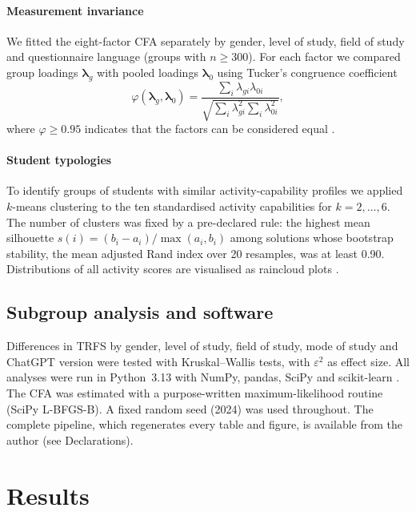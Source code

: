 \documentclass[pdflatex,sn-basic]{sn-jnl}%
\theoremstyle{plain}
\theoremstyle{remark}
\begin{document}
\paragraph{Measurement invariance} We fitted the eight-factor CFA separately by gender, level of study, field of study and questionnaire language (groups with $n\ge300$). For each factor we compared group loadings $\boldsymbol\lambda_g$ with pooled loadings $\boldsymbol\lambda_0$ using Tucker's congruence coefficient
\begin{equation}
\varphi(\boldsymbol\lambda_g,\boldsymbol\lambda_0)=\frac{\sum_i\lambda_{gi}\lambda_{0i}}{\sqrt{\sum_i\lambda_{gi}^2\sum_i\lambda_{0i}^2}},
\label{eq:tucker}
\end{equation}
where $\varphi\ge0.95$ indicates that the factors can be considered equal \citep{lorenzo2006}.

\paragraph{Student typologies} To identify groups of students with similar activity-capability profiles we applied $k$-means clustering \citep{lloyd1982} to the ten standardised activity capabilities for $k=2,\dots,6$. The number of clusters was fixed by a pre-declared rule: the highest mean silhouette $s(i)=(b_i-a_i)/\max(a_i,b_i)$ \citep{rousseeuw1987} among solutions whose bootstrap stability, the mean adjusted Rand index \citep{hubert1985} over 20 resamples, was at least 0.90. Distributions of all activity scores are visualised as raincloud plots \citep{allen2019}.

\subsection{Subgroup analysis and software}
Differences in TRFS by gender, level of study, field of study, mode of study and ChatGPT version were tested with Kruskal--Wallis tests, with $\varepsilon^2$ as effect size. All analyses were run in Python~3.13 with NumPy, pandas, SciPy and scikit-learn \citep{pedregosa2011}. The CFA was estimated with a purpose-written maximum-likelihood routine (SciPy L-BFGS-B). A fixed random seed (2024) was used throughout. The complete pipeline, which regenerates every table and figure, is available from the author (see Declarations).

\section{Results}
\label{sec:results}
\end{document}
